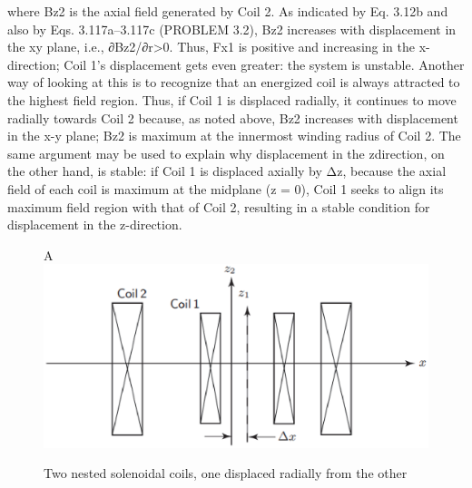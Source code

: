 where Bz2 is the axial field generated by Coil 2. As indicated by Eq. 3.12b and also
by Eqs. 3.117a–3.117c (PROBLEM 3.2), Bz2 increases with displacement in the xy plane, i.e., ∂Bz2/∂r>0. Thus, Fx1 is positive and increasing in the x-direction;
Coil 1’s displacement gets even greater: the system is unstable.
Another way of looking at this is to recognize that an energized coil is always
attracted to the highest field region. Thus, if Coil 1 is displaced radially, it continues to move radially towards Coil 2 because, as noted above, Bz2 increases with
displacement in the x-y plane; Bz2 is maximum at the innermost winding radius
of Coil 2. The same argument may be used to explain why displacement in the zdirection, on the other hand, is stable: if Coil 1 is displaced axially by Δz, because
the axial field of each coil is maximum at the midplane (z = 0), Coil 1 seeks to
align its maximum field region with that of Coil 2, resulting in a stable condition
for displacement in the z-direction.

\begin{figure}[htbp]A
	\centering
	\includegraphics[scale=0.5]{chpt3/figs/fig3.47.eps}
	\caption{Two nested solenoidal coils, one displaced radially from the other}
\end{figure}
\newpage



